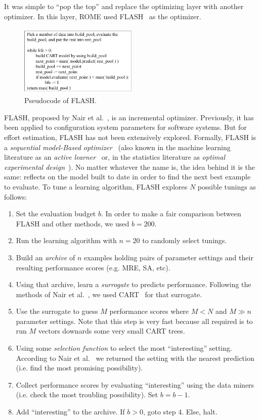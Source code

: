 \documentclass[sigconf,review]{acmart}
\begin{document}
It was simple  to ``pop the top'' and replace the optimizing layer with another optimizer. In this layer, ROME used FLASH~\cite{nair2017flash} as the optimizer.


\begin{figure}
\centerline{\includegraphics[width=0.5\textwidth]{flash.pdf}}
\caption{Pseudocode of FLASH.}\label{flash}  
\end{figure}



FLASH, proposed by Nair et al.~\cite{nair2017flash}, is an incremental optimizer.
Previously, it has been applied to configuration system parameters for software systems. But for effort estimation, FLASH has not been extensively explored.
Formally, FLASH is a   {\em sequential model-Based optimizer}~\cite{bergstra2011algorithms} (also known
in the machine learning literature
as an {\em active learner}~\cite{das16} or, in  the statistics literature  as 
{\em optimal experimental design}~\cite{olsson2009literature}). No matter whatever the name is, the idea behind it is the same:
reflects on the model built to date in order to find the next best example
to evaluate. To tune a learning algorithm, FLASH explores $N$ possible tunings as follows:
\begin{enumerate}
\item
Set the evaluation budget $b$. In order to make a fair comparison between FLASH and other methods, we used $b=200$.
 \item
Run the learning algorithm with $n=20$ to randomly select tunings.
\item Build an {\em archive} of  $n$   examples holding pairs of  parameter settings and   their resulting performance scores
(e.g. MRE, SA, etc).
\item
Using that archive, learn a {\em surrogate}   to predicts performance. 
Following the methods of Nair et al.~\cite{nair2017flash}, we used   CART~\cite{brieman84}
for that surrogate.
\item Use the surrogate to guess  $M$ performance scores where
$M<N$ and $M \gg n$ parameter settings. Note that this step is very fast because all required is to run $M$ vectors downards some very small CART trees.
\item Using some {\em selection  function} to select  the most ``interesting'' setting. According to Nair et al.~\cite{nair2017flash} 
we returned the setting with the nearest prediction (i.e. find the most promising possibility).
\item Collect performance scores by evaluating    ``interesting'' using
the data miners (i.e. check the most troubling
possibility). Set $b=b-1$.
\item  Add  ``interesting'' to the archive. If  $b>0$, goto step 4. Else, halt.
\end{enumerate}
\end{document}

